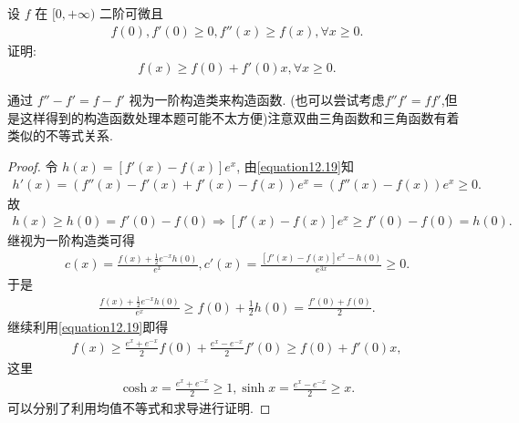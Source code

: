 \documentclass[../../main.tex]{subfiles}%
\begin{document}
\begin{example}
设 $f$ 在 $[0,+\infty)$ 二阶可微且
\begin{align}
f(0),f'(0)\geqslant0,f''(x)\geqslant f(x),\forall x\geqslant0.
\label{equation12.19}
\end{align}
证明:
\begin{align}
f(x)\geqslant f(0)+f'(0)x,\forall x\geqslant0.
\label{equation12.20}
\end{align}
\end{example}
\begin{note}
通过 $f'' - f' = f - f'$ 视为一阶构造类来构造函数. (也可以尝试考虑$f''f'=ff'$,但是这样得到的构造函数处理本题可能不太方便)注意双曲三角函数和三角函数有着类似的不等式关系.
\end{note}
\begin{proof}

令 $h(x)=[f'(x)-f(x)]e^x$, 由\eqref{equation12.19}知
\begin{align*}
h' \left( x \right) =\left( f'' \left( x \right) -f' \left( x \right) +f' \left( x \right) -f\left( x \right) \right) e^x=\left( f'' \left( x \right) -f\left( x \right) \right) e^x \geqslant 0.
\end{align*}
故
\begin{align*}
h(x)\geqslant  h(0)=f'(0)-f(0)\Rightarrow [f'(x)-f(x)]e^x\geqslant  f'(0)-f(0)=h(0).
\end{align*}
继视为一阶构造类可得
\begin{align*}
c(x)=\frac{f(x)+\frac{1}{2}e^{-x}h(0)}{e^{x}},c'(x)=\frac{[f'(x)-f(x)]e^x-h(0)}{e^{3x}}\geqslant0.
\end{align*}
于是
\begin{align*}
\frac{f(x)+\frac{1}{2}e^{-x}h(0)}{e^{x}}\geqslant f(0)+\frac{1}{2}h(0)=\frac{f'(0)+f(0)}{2}.
\end{align*}
继续利用\eqref{equation12.19}即得
\begin{align*}
f(x)\geqslant\frac{e^{x}+e^{-x}}{2}f(0)+\frac{e^{x}-e^{-x}}{2}f'(0)\geqslant f(0)+f'(0)x,
\end{align*}
这里
\begin{align*}
\cosh x=\frac{e^{x}+e^{-x}}{2}\geqslant1,\sinh x=\frac{e^{x}-e^{-x}}{2}\geqslant x.
\end{align*}
可以分别了利用均值不等式和求导进行证明. 

\end{proof}
\end{document}
